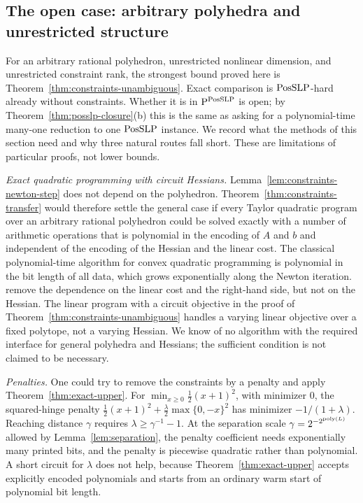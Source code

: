 \subsection{The open case: arbitrary polyhedra and unrestricted structure}
\label{sec:constraints-open}

For an arbitrary rational polyhedron, unrestricted nonlinear dimension, and
unrestricted constraint rank, the strongest bound proved here is
Theorem~\ref{thm:constraints-unambiguous}. Exact comparison is
$\mathrm{PosSLP}$-hard already without constraints. Whether it is in
$\mathrm P^{\mathrm{PosSLP}}$ is open; by Theorem~\ref{thm:posslp-closure}(b) this is the
same as asking for a polynomial-time many-one reduction to one $\mathrm{PosSLP}$
instance. We record what the methods of this section need and why three
natural routes fall short. These are limitations of particular proofs, not
lower bounds.

\emph{Exact quadratic programming with circuit Hessians.}
Lemma~\ref{lem:constraints-newton-step} does not depend on the polyhedron.
Theorem~\ref{thm:constraints-transfer} would therefore settle the general case
if every Taylor quadratic program over an arbitrary rational polyhedron could
be solved exactly with a number of arithmetic operations that is polynomial in
the encoding of $A$ and $b$ and independent of the encoding of the Hessian and
the linear cost. The classical polynomial-time algorithm for convex quadratic
programming \citep{KozlovTarasovKhachiyan1980} is polynomial in the bit length
of all data, which grows exponentially along the Newton iteration.
\citet{GranotSkorinKapov1990} remove the dependence on the linear cost and the
right-hand side, but not on the Hessian. The linear program with a circuit
objective in the proof of Theorem~\ref{thm:constraints-unambiguous} handles a
varying linear objective over a fixed polytope, not a varying Hessian. We know
of no algorithm with the required interface for general polyhedra and
Hessians; the sufficient condition is not claimed to be necessary.

\emph{Penalties.} One could try to remove the constraints by a penalty and
apply Theorem~\ref{thm:exact-upper}. For $\min_{x\ge0}\frac12(x+1)^2$, with
minimizer $0$, the squared-hinge penalty
$\frac12(x+1)^2+\frac\lambda2\max\{0,-x\}^2$ has minimizer
$-1/(1+\lambda)$. Reaching distance $\gamma$ requires
$\lambda\ge\gamma^{-1}-1$. At the separation scale
$\gamma=2^{-2^{\operatorname{poly}(L)}}$ allowed by Lemma~\ref{lem:separation}, the penalty coefficient
needs exponentially many printed bits, and the penalty is piecewise quadratic
rather than polynomial. A short circuit for $\lambda$ does not help, because
Theorem~\ref{thm:exact-upper} accepts explicitly encoded polynomials and
starts from an ordinary warm start of polynomial bit length.

